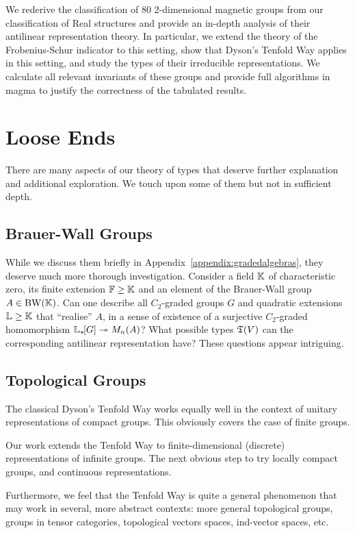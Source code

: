 We rederive the classification of 80 $2$-dimensional magnetic groups from our classification of Real structures and provide an in-depth analysis of their antilinear representation theory. In particular, we extend the theory of the Frobenius-Schur indicator to this setting, show that Dyson's Tenfold Way applies in this setting, and study the types of their irreducible representations. We calculate all relevant invariants of these groups and provide full algorithms in magma to justify the correctness of the tabulated results.

\section*{Loose Ends}
There are many aspects of our theory of types that deserve further explanation and additional exploration.
We touch upon some of them but not in sufficient depth.

\subsection*{Brauer-Wall Groups}
While we discuss them briefly in Appendix~\ref{appendix:gradedalgebras}, they deserve much more thorough investigation.
Consider a field ${\mathbb K}$ of characteristic zero, its finite extension ${\mathbb F}\geq {\mathbb K}$ and an element of the Brauer-Wall group $A\in\operatorname{BW}({\mathbb K})$.
Can one describe all $C_2$-graded groups $G$ and quadratic extensions ${\mathbb L}\geq {\mathbb K}$ that ``realise'' $A$, in a sense of existence of
a surjective $C_2$-graded homomorphism ${\mathbb L}_{\star \hspace{-0.1em}}[G] \twoheadrightarrow M_n (A)$?
What possible types ${\mathfrak T} (V)$ can the corresponding antilinear representation have? These questions appear intriguing.

\subsection*{Topological Groups}
The classical Dyson's Tenfold Way works equally well in the context of unitary representations of compact groups.
This obviously covers the case of finite groups.

Our work extends the Tenfold Way to finite-dimensional (discrete) representations of infinite groups. The next obvious step to try locally compact groups, and continuous representations.

Furthermore, we feel that the Tenfold Way is quite a general phenomenon that may work in several, more abstract contexts: more general topological groups, groups in tensor categories, topological vectors spaces, ind-vector spaces, etc.

